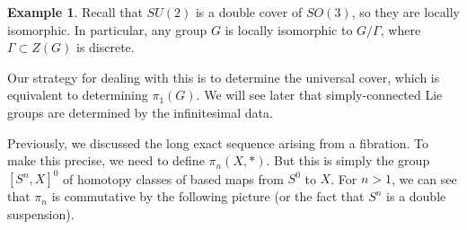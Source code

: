 \documentclass[leqno, openany]{memoir}
\theoremstyle{definition}
\newtheorem{exm}[thm]{Example}
\theoremstyle{remark}
\theoremstyle{plain}
\theoremstyle{definition}
\theoremstyle{remark}
\begin{document}
\begin{exm}
    Recall that $SU(2)$ is a double cover of $SO(3)$, so they are locally isomorphic. In particular, any group $G$ is locally isomorphic to $G / \Gamma$, where $\Gamma \subset Z(G)$ is discrete.
\end{exm}

Our strategy for dealing with this is to determine the universal cover, which is equivalent to determining $\pi_1(G)$. We will see later that simply-connected Lie groups are determined by the infinitesimal data.

Previously, we discussed the long exact sequence arising from a fibration. To make this precise, we need to define $\pi_n(X,*)$. But this is simply the group $[S^n, X]^0$ of homotopy classes of based maps from $S^0$ to $X$. For $n > 1$, we can see that $\pi_n$ is commutative by the following picture (or the fact that $S^n$ is a double suspension).
\end{document}
